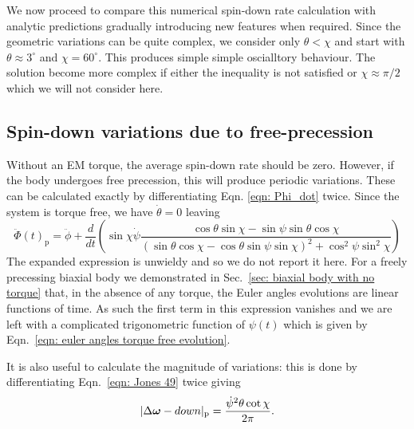 \documentclass[../full_thesis/full_thesis.tex]{subfiles}
\begin{document}
We now proceed to compare this numerical spin-down rate calculation with analytic
predictions gradually introducing new features when required. Since the geometric
variations can be quite complex, we consider only $\theta < \chi$ and start
with $\theta \approx 3^{\circ}$ and $\chi=60^{\circ}$. This produces simple
simple oscialltory behaviour. The solution become more complex if either
the inequality is not satisfied or $\chi \approx \pi/2$ which we will not
consider here.

\subsection{Spin-down variations due to free-precession}
\label{sec: spin-down free precession}

Without an EM torque, the average spin-down rate should be zero. However, if
the body undergoes free precession, this will produce periodic variations.
These can be calculated exactly by differentiating Eqn. \eqref{eqn: Phi_dot}
twice. Since the system is torque free, we have $\dot{\theta} = 0$ leaving
\begin{equation}
    \ddot{\Phi}(t)_{\mathrm{p}} = \ddot{\phi} + \frac{d}{dt}\left(
        \sin\chi\dot{\psi} \frac{\cos\theta\sin\chi - \sin \psi \sin \theta \cos\chi
}{(\sin\theta \cos \chi - \cos \theta \sin \psi \sin \chi)^{2} + \cos^{2}\psi \sin^{2} \chi}
\right)
\label{eqn: Phi_ddot FP}
\end{equation}
The expanded expression is unwieldy and so we do not report it here. For a
freely precessing biaxial body we demonstrated in Sec.~\ref{sec: biaxial body
with no torque} that, in the absence of any torque, the Euler angles evolutions
are linear functions of time. As such the first term in this expression
vanishes and we are left with a complicated trigonometric function of $\psi(t)$
which is given by Eqn.~\eqref{eqn: euler angles torque free evolution}.

It is also useful to calculate the magnitude of variations: this is done by
differentiating Eqn.~\eqref{eqn: Jones 49} twice giving
\begin{equation}
    |\Delta\boldsymbol{\omega}-down|_{\mathrm{p}} =\frac{\dot{\psi}^{2} \theta \cot\chi}{2\pi}.
    \label{eqn: spin-down variations FP}
\end{equation}
\end{document}
